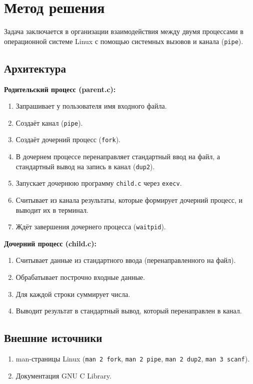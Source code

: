 \section{Метод решения}
Задача заключается в организации взаимодействия между двумя процессами в операционной системе Linux с помощью системных вызовов и канала (\texttt{pipe}).
\subsection*{Архитектура}
\textbf{Родительский процесс (parent.c):}
\begin{enumerate}
    \item Запрашивает у пользователя имя входного файла.
    \item Создаёт канал (\texttt{pipe}).
    \item Создаёт дочерний процесс (\texttt{fork}).
    \item В дочернем процессе перенаправляет стандартный ввод на файл, а стандартный вывод на запись в канал (\texttt{dup2}).
    \item Запускает дочернюю программу \texttt{child.c} через \texttt{execv}.
    \item Считывает из канала результаты, которые формирует дочерний процесс, и выводит их в терминал.
    \item Ждёт завершения дочернего процесса (\texttt{waitpid}).
\end{enumerate}

\textbf{Дочерний процесс (child.c):}
\begin{enumerate}
    \item Считывает данные из стандартного ввода (перенаправленного на файл).
    \item Обрабатывает построчно входные данные.
    \item Для каждой строки суммирует числа.
    \item Выводит результат в стандартный вывод, который перенаправлен в канал.
\end{enumerate}

\subsection*{Внешние источники}
\begin{enumerate}
    \item man-страницы Linux (\texttt{man 2 fork}, \texttt{man 2 pipe}, \texttt{man 2 dup2}, \texttt{man 3 scanf}).
    \item Документация GNU C Library.
\end{enumerate}

